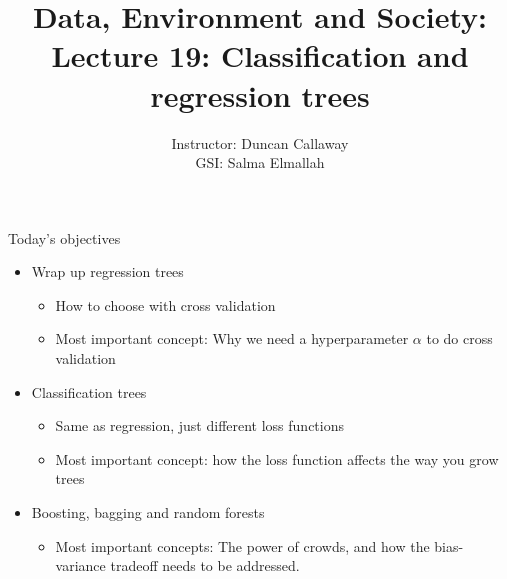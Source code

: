 \documentclass[mathserif, aspectratio=169]{beamer}
\title[Lecture 19] %
{Data, Environment and Society: \\{Lecture 19: Classification and regression trees}}
\author[ER131: Data, Environment and Society] 
{Instructor: Duncan Callaway\\
GSI: Salma Elmallah}
\institute[UC Berkeley] %
 {\small{ \bf November 5, 2019}}
\date[November 5, 2019]
\begin{document}


\begin{frame}{Today's objectives}


\begin{itemize}
\item Wrap up regression trees
\begin{itemize}
\item How to choose with cross validation
\item Most important concept: Why we need a hyperparameter $\alpha$ to do cross validation
\end{itemize}
\item Classification trees
\begin{itemize}
\item Same as regression, just different loss functions
\item Most important concept: how the loss function affects the way you grow trees
\end{itemize}
\item Boosting, bagging and random forests
\begin{itemize}
	\item Most important concepts: The power of crowds, and how the bias-variance tradeoff needs to be addressed.
\end{itemize}
\end{itemize}
\end{frame}
\end{document}

